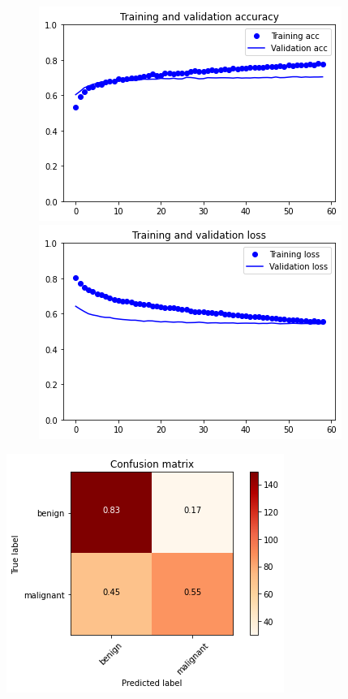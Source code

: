 \documentclass{article}
\begin{document}
\begin{figure}[h]
    \centering
    \begin{minipage}{0.45\textwidth}
        \centering
        \includegraphics[scale=0.46]{./img/preTrainValInception_ft_3_2.png}
    \end{minipage}\hfill
    \begin{minipage}{0.45\textwidth}
        \centering
        \includegraphics[scale=0.46]{./img/preTrainLossInception_ft_3_2.png}
    \end{minipage}
\end{figure}

\begin{center}
\begin{minipage}{0.45\textwidth}
        \includegraphics[scale=0.6]{./img/cmPreTrainInception_ft_3_2.png}
    \end{minipage}
\end{center}
\end{document}
